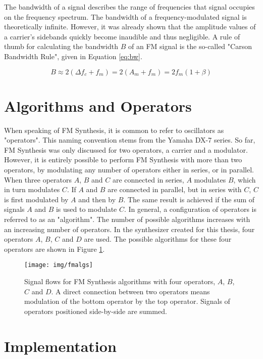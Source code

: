   The bandwidth of a signal describes the range of frequencies that signal occupies on the frequency spectrum. The bandwidth of a frequency-modulated signal is theoretically infinite. However, it was already shown that the amplitude values of a carrier's sidebands quickly become inaudible and thus negligible. A rule of thumb for calculating the bandwidth $B$ of an FM signal is the so-called "Carson Bandwidth Rule", given in Equation \ref{eq:bw}.

  \begin{equation}
    B \approx 2(\Delta f_{c} + f_{m}) = 2(A_{m} + f_{m}) = 2f_{m}(1 + \beta)
    \label{eq:bw}
  \end{equation}

  \section{Algorithms and Operators}

  When speaking of FM Synthesis, it is common to refer to oscillators as "operators". This naming convention stems from the Yamaha DX-7 series. So far, FM Synthesis was only discussed for two operators, a carrier and a modulator. However, it is entirely possible to perform FM Synthesis with more than two operators, by modulating any number of operators either in series, or in parallel. When three operators $A$, $B$ and $C$ are connected in series, $A$ modulates $B$, which in turn modulates $C$. If $A$ and $B$ are connected in parallel, but in series with $C$, $C$ is first modulated by $A$ and then by $B$. The same result is achieved if the sum of signals $A$ and $B$ is used to modulate $C$. In general, a configuration of operators is referred to as an "algorithm". The number of possible algorithms increases with an increasing number of operators. In the synthesizer created for this thesis, four operators $A$, $B$, $C$ and $D$ are used. The possible algorithms for these four operators are shown in Figure \ref{fig:fmalgs}.

  \begin{figure}[p!]
    \texttt{[image: img/fmalgs]}
    \caption{Signal flows for FM Synthesis algorithms with four operators, $A$, $B$, $C$ and $D$. A direct connection between two operators means modulation of the bottom operator by the top operator. Signals of operators positioned side-by-side are summed.}
    \label{fig:fmalgs}
  \end{figure}

  \section{Implementation}

